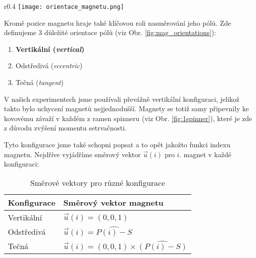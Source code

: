 \documentclass[12pt, a4paper,
 twoside,        %
 openright
]{report}
\begin{document}
\begin{wrapfigure}{r}{0.4\textwidth}
    \texttt{[image: orientace\_magnetu.png]}
    \centering
    \caption{Tři námi vyhranění orientace magnetů}
    \label{fig:mag_orientations}
\end{wrapfigure}

Kromě pozice magnetu hraje také klíčovou roli nasměrování jeho pólů. Zde definujeme 3 důležité orientace pólů (viz Obr. \ref{fig:mag_orientations}):

\begin{enumerate}[topsep=0pt, partopsep=0pt]
    \setlength{\itemsep}{0pt}%
    \setlength{\parskip}{0pt}%
    \item \textbf{Vertikální (\textit{vertical})}
    \item Odstředivá (\textit{eccentric})
    \item Tečná (\textit{tangent})
\end{enumerate}

V našich experimentech jsme používali převážně vertikální konfiguraci, jelikož takto bylo uchycení magnetů nejjednodušší.
Magnety se totiž samy připevnily ke kovovému závaží v každém z ramen spinneru (viz Obr. \ref{fig:1spinner}), které je zde z důvodu zvýšení momentu setrvačnosti.

Tyto konfigurace jsme také schopni popsat a to opět jakožto funkci indexu magnetu.
Nejdříve vyjádříme směrový vektor $\vec{u}(i)$ pro $i$. magnet v každé konfiguraci:

\vspace{24pt}

\begin{table}[!ht]
    \captionsetup{justification=raggedright,singlelinecheck=off}
    \caption{Směrové vektory pro různé konfigurace}
    \label{tab:mag_dir_vec}

    \def\arraystretch{1.5}
    \begin{tabularx}{\textwidth}{p{} p{} }
        \textbf{Konfigurace} & \textbf{Směrový vektor magnetu}                    \\
        \hline
        Vertikální           & $\vec{u}(i) = (0,0,1)$                             \\
        Odstředivá           & $\vec{u}(i) = \widehat{P(i) - S}$                  \\
        Tečná                & $\vec{u}(i) = (0,0,1) \times \widehat{(P(i) - S)}$ \\
    \end{tabularx}
\end{table}
\end{document}
